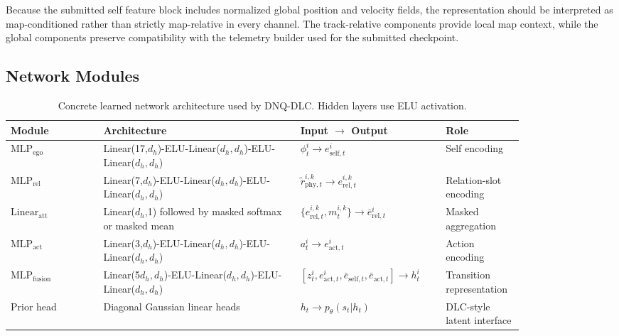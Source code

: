 \documentclass[journal]{IEEEtran}
\begin{document}
Because the submitted self feature block includes normalized global
position and velocity fields, the representation should be interpreted
as map-conditioned rather than strictly map-relative in every channel.
The track-relative components provide local map context, while the
global components preserve compatibility with the telemetry builder used
for the submitted checkpoint.

\subsection{Network Modules}
\label{supp:net}

\begin{table}[t]
\centering
\caption{Concrete learned network architecture used by DNQ-DLC.
Hidden layers use ELU activation.}
\label{tab:supp_network}
\begin{tabular}{p{0.16\linewidth}p{0.34\linewidth}p{0.24\linewidth}p{0.10\linewidth}}
\hline
Module & Architecture & Input $\rightarrow$ Output & Role \\
\hline
$\mathrm{MLP}_{\mathrm{ego}}$ &
Linear(17,$d_h$)-ELU-Linear($d_h,d_h$)-ELU-Linear($d_h,d_h$) &
$\phi_t^i\rightarrow e_{\mathrm{self},t}^i$ &
Self encoding \\

$\mathrm{MLP}_{\mathrm{rel}}$ &
Linear(7,$d_h$)-ELU-Linear($d_h,d_h$)-ELU-Linear($d_h,d_h$) &
$\tilde r_{\mathrm{phy},t}^{i,k}\rightarrow e_{\mathrm{rel},t}^{i,k}$ &
Relation-slot encoding \\

$\mathrm{Linear}_{\mathrm{att}}$ &
Linear($d_h$,1) followed by masked softmax or masked mean &
$\{e_{\mathrm{rel},t}^{i,k},m_t^{i,k}\}\rightarrow \bar e_{\mathrm{rel},t}^i$ &
Masked aggregation \\

$\mathrm{MLP}_{\mathrm{act}}$ &
Linear(3,$d_h$)-ELU-Linear($d_h,d_h$)-ELU-Linear($d_h,d_h$) &
$a_t^i\rightarrow e_{\mathrm{act},t}^i$ &
Action encoding \\

$\mathrm{MLP}_{\mathrm{fusion}}$ &
Linear(5$d_h,d_h$)-ELU-Linear($d_h,d_h$)-ELU-Linear($d_h,d_h$) &
$[z_t^i,e_{\mathrm{act},t}^i,\bar e_{\mathrm{self},t},\bar e_{\mathrm{act},t}]
\rightarrow h_t^i$ &
Transition representation \\

Prior head &
Diagonal Gaussian linear heads &
$h_t\rightarrow p_\theta(s_t|h_t)$ &
DLC-style latent interface \\


\end{tabular}
\end{table}
\end{document}
